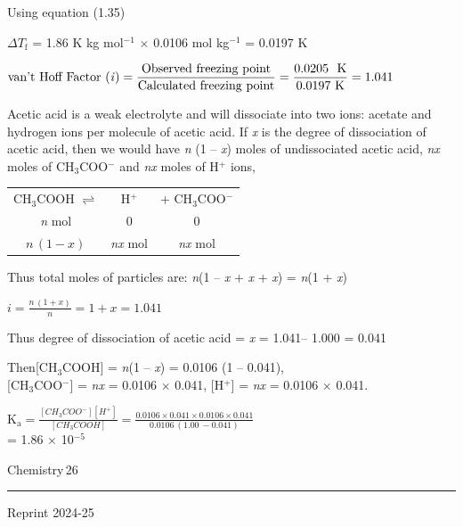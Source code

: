 \documentclass[11pt,a4paper]{article}
\begin{document}
\begin{tcolorbox}
\begin{minipage}[t]{0.78\linewidth}
Using equation (1.35)

$\Delta T_\text{f}$ = 1.86 K kg mol$^{-1}$ $\times$ 0.0106 mol kg$^{-1}$ = 0.0197 K

\noindent$\displaystyle \text{van't Hoff Factor (\textit{i})} = \frac{\text{Observed freezing point}}{\text{Calculated freezing point}} = \frac{0.0205\ \ \text{K}}{0.0197\ \text{K}} = 1.041$

Acetic acid is a weak electrolyte and will dissociate into two ions: acetate and hydrogen ions per molecule of acetic acid. If \textit{x} is the degree of dissociation of acetic acid, then we would have \textit{n} (1 -- \textit{x}) moles of undissociated acetic acid, \textit{nx} moles of CH$_3$COO$^-$ and \textit{nx} moles of H$^+$ ions,

\hspace*{3em}\begin{tabular}{@{}ccc@{}}
CH$_3$COOH $\rightleftharpoons$ & H$^+$ & + CH$_3$COO$^-$\\
\textit{n} mol & 0 & 0\\
$n\,(1 - x)$ & \textit{nx} mol & \textit{nx} mol
\end{tabular}

Thus total moles of particles are: \textit{n}(1 -- \textit{x} + \textit{x} + \textit{x}) = \textit{n}(1 + \textit{x})

\hspace*{3em}$\displaystyle i = \frac{n\,(1 + x)}{n} = 1 + x = 1.041$

Thus degree of dissociation of acetic acid = \textit{x} = 1.041-- 1.000 = 0.041

Then\hspace{1em}[CH$_3$COOH] = \textit{n}(1 -- \textit{x}) = 0.0106 (1 -- 0.041),\\
\hspace*{3.2em}[CH$_3$COO$^-$] = \textit{nx} = 0.0106 $\times$ 0.041, [H$^+$] = \textit{nx} = 0.0106 $\times$ 0.041.

\noindent$\displaystyle \text{K}_\text{a} = \frac{[CH_3COO^-][H^+]}{[CH_3COOH]} = \frac{0.0106 \times 0.041 \times 0.0106 \times 0.041}{0.0106\ (1.00\ - 0.041)}$\\
\hspace*{1.4em}= 1.86 $\times$ 10$^{-5}$
\end{minipage}
\end{tcolorbox}

\vfill
\noindent\begin{minipage}{0.3\textwidth}
{\color{gray}Chemistry}\hspace{6pt}\colorbox{Goldenrod1}{\color{gray}\,26\,}\\[-6pt]
{\color{Goldenrod1}\rule{\linewidth}{1pt}}
\end{minipage}
\begin{center}
{\sffamily\small Reprint 2024-25}
\end{center}
\end{document}
